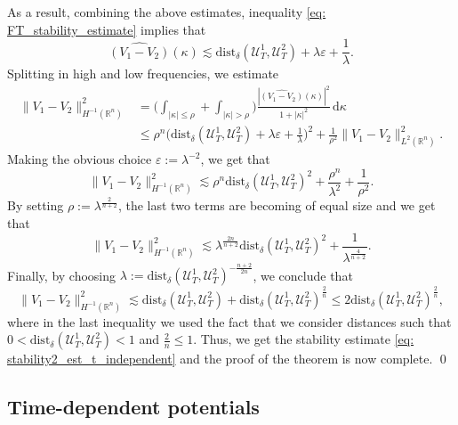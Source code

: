\documentclass[10pt,a4paper]{amsart}
\theoremstyle{remark}
\theoremstyle{definition}
\newcommand{\R}{\mathbb{R}}
\newcommand{\dd}{\mathrm{d}}
\newcommand{\dist}{\mathrm{dist}}
\def\ve{\varepsilon}
\def\lec{\lesssim}
\def\wh{\widehat}
\def\cal{\mathcal}
\begin{document}
%
As a result, combining the above estimates, inequality \eqref{eq: FT_stability_estimate} implies that 
%
\[
\wh{(V_1-V_2)}(\kappa) \lec \dist_\delta(\cal{U}_T^1, \cal{U}_T^2) + \lambda \ve + \frac{1}{\lambda}.
\]
%
Splitting in high and low frequencies, we estimate 
%
\begin{align*}
\|V_1-V_2\|_{H^{-1}(\R^n)}^2 &= \Big( \int_{|\kappa|\leq \rho} + \int_{|\kappa|>\rho} \Big) \frac{|\wh{(V_1-V_2)}(\kappa)|^2}{1+|\kappa|^2}\, \dd\kappa \\
%
&\leq \rho^n \Big( \dist_\delta(\cal{U}^1_T, \cal{U}^2_T)  + \lambda \ve + \frac{1}{\lambda} \Big)^2 + \frac{1}{\rho^2} \| V_1-V_2 \|_{L^2(\R^n)}^2.
\end{align*}
%
Making the obvious choice $\ve:= \lambda^{-2}$, we get that 
%
\[
\|V_1-V_2\|_{H^{-1}(\R^n)}^2 \lec \rho^n \dist_\delta(\cal{U}^1_T, \cal{U}^2_T)^2 + \frac{\rho^n}{\lambda^2} + \frac{1}{\rho^2}.
\]
%
By setting $\rho:= \lambda^\frac{2}{n+2}$, the last two terms are becoming of equal size and we get that 
%
\[
\|V_1-V_2\|_{H^{-1}(\R^n)}^2 \lec \lambda^\frac{2n}{n+2} \dist_\delta(\cal{U}^1_T, \cal{U}^2_T)^2 + \frac{1}{\lambda^\frac{4}{n+2}}.
\]
%
Finally, by choosing $\lambda:= \dist_\delta(\cal{U}^1_T, \cal{U}^2_T)^{-\frac{n+2}{2n}}$, we conclude that 
%
\[
\|V_1-V_2\|_{H^{-1}(\R^n)}^2 \lec  \dist_\delta(\cal{U}^1_T, \cal{U}^2_T) +  \dist_\delta(\cal{U}^1_T, \cal{U}^2_T)^\frac{2}{n} 
\leq 2  \dist_\delta(\cal{U}^1_T, \cal{U}^2_T)^\frac{2}{n}, 
\]
%
where in the last inequality we used the fact that we consider distances such that $ 0< \dist_\delta(\cal{U}^1_T, \cal{U}^2_T) < 1$ and $\frac{2}{n} \leq 1$. 
Thus, we get the stability estimate \eqref{eq: stability2_est_t_independent} and the proof of the theorem is now complete. 
\qed




%
\subsection{Time-dependent potentials}\label{ssec: stability_time_dependent}
\end{document}
